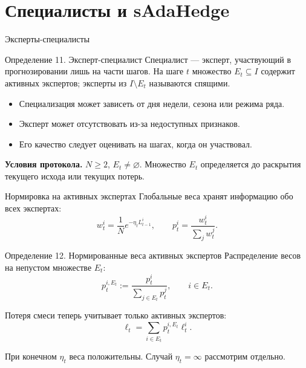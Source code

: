 \documentclass[11pt,aspectratio=169]{beamer}
\begin{document}
\section{Специалисты и sAdaHedge}
\begin{frame}{Эксперты-специалисты}
  \begin{block}{Определение 11. Эксперт-специалист}
    Специалист --- эксперт, участвующий в прогнозировании лишь на части шагов.
    На шаге $t$ множество $E_t\subseteq I$ содержит активных экспертов;
    эксперты из $I\setminus E_t$ называются спящими.
  \end{block}
  \begin{itemize}
    \item Специализация может зависеть от дня недели, сезона или режима ряда.
    \item Эксперт может отсутствовать из-за недоступных признаков.
    \item Его качество следует оценивать на шагах, когда он участвовал.
  \end{itemize}
  \par\medskip\textbf{Условия протокола.}
    $N\ge2$, $E_t\ne\varnothing$. Множество $E_t$ определяется
    до раскрытия текущего исхода или текущих потерь.
\end{frame}

\begin{frame}{Нормировка на активных экспертах}
  Глобальные веса хранят информацию обо всех экспертах:
  \[
    w_t^i=\frac1N e^{-\eta_t L_{t-1}^i},\qquad
    p_t^i=\frac{w_t^i}{\sum_j w_t^j}.
  \]
  \begin{block}{Определение 12. Нормированные веса активных экспертов}
    Распределение весов на непустом множестве $E_t$:
    \[
       p_t^{i,E_t}:=\frac{p_t^i}{\sum_{j\in E_t}p_t^j},\qquad i\in E_t.
    \]
  \end{block}
  Потеря смеси теперь учитывает только активных экспертов:
  \[\ell_t=\sum_{i\in E_t} p_t^{i,E_t}\ell_t^i.\]
  \par\vfill{\scriptsize При конечном $\eta_t$ веса положительны. Случай $\eta_t=\infty$ рассмотрим отдельно.\par}
\end{frame}
\end{document}
